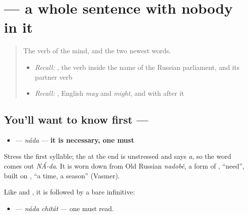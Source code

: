 \section[\texorpdfstring{\ru{надо} (náda)}{надо (náda)}]{ — a whole sentence with nobody in it}

\label{lesson:RU-C20-nado}



\begin{quote}
The verb of the mind, and the two newest words.

\begin{itemize}
\raggedright
  \item \emph{Recall:} \emph{}, the verb inside the name of the Russian parliament, and its partner verb
  \item \emph{Recall:} \emph{}, English \emph{may} and \emph{might}, and \emph{} with \textbf{} after it
\end{itemize}
\end{quote}

\subsection*{You'll want to know first — }
\begin{itemize}
\raggedright
  \item \textbf{} — \emph{náda} — \textbf{it is necessary, one must}
\end{itemize}

Stress the first syllable; the \textbf{} at the end is unstressed and says \emph{a}, so the word comes out \emph{NÁ-da}. It is worn down from Old Russian \emph{nadobě}, a form of \emph{}, \textquotedblleft{}need\textquotedblright{}, built on \emph{}, \textquotedblleft{}a time, a season\textquotedblright{} (Vasmer).

Like \textbf{} and \textbf{}, it is followed by a bare infinitive:

\begin{itemize}
\raggedright
  \item \textbf{ } — \emph{náda chitát} — one must read.
\end{itemize}

